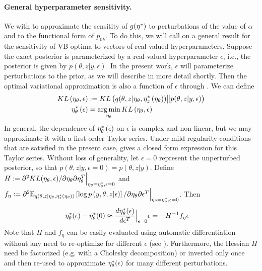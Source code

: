 
\paragraph{General hyperparameter sensitivity.}
%
We with to approximate the sensitity of $g(\eta^{*})$ to perturbations of the
value of $\alpha$ and to the functional form of $p_{0k}$.  To do this, we will
call on a general result for the sensitivity of VB optima to vectors of
real-valued hyperparameters.  Suppose the exact posterior is parameterized by a
real-valued hyperparameter $\epsilon$, i.e., the posterior is given by
$p\left(\theta, z \vert y, \epsilon\right)$. In the present work, $\epsilon$
will parameterize perturbations to the prior, as we will describe in more detail
shortly.  Then the optimal variational approximation is also a function of
$\epsilon$ through .  We can define
%
\begin{align}
KL\left(\eta_\theta, \epsilon\right) &:=
    KL\left(q(\theta, z \vert \eta_\theta, \eta_z^{*}\left(\eta_\theta\right))
    \big\| p(\theta, z | y, \epsilon) \right) \nonumber \\
\eta_\theta^{*}\left(\epsilon\right) &=
    \operatorname*{arg\,min}_{\eta_\theta} KL\left(\eta_\theta, \epsilon\right)
    \label{eq:pert_kl_objective}
\end{align}
%
In general, the dependence of $\eta_\theta^{*}\left(\epsilon\right)$ on $\epsilon$ is
complex and non-linear, but we may approximate it with a first-order Taylor
series.
Under mild regularity conditions that are satisfied in the present case,
\citet[Theorem 2]{giordano:2017:covariances} gives a closed form
expression for this Taylor series.
Without loss of generality, let $\epsilon=0$ represent the unperturbed
posterior, so that $p\left(\theta, z \vert y, \epsilon=0\right) = p\left(\theta,
z \vert y \right)$.
Define
$H := \partial^2 KL(\eta_\theta, \epsilon) /
    \partial \eta_\theta \partial \eta_\theta^T
    \Big\rvert_{\eta_\theta = \eta_\theta^{*}, \epsilon = 0}$ and
$f_\eta := \partial^2
    \mathbb{E}_{q\left(\theta, z \vert \eta_\theta, \eta_z^{*}(\eta_\theta)\right)} \left[ \log p\left(y, \theta, z \vert \epsilon \right) \right]
    / \partial \eta_\theta \partial \epsilon^T
    \Big\rvert_{\eta_\theta = \eta_\theta^{*}, \epsilon = 0}$.
Then
%
\begin{align}
\eta_\theta^{*}(\epsilon)  -  \eta_\theta^{*}(0) &\approx
\frac{d \eta_\theta^{*}(\epsilon)}{d\epsilon^T}\Big|_{\epsilon=0} \epsilon =
- H^{-1} f_\eta \epsilon
\label{eq:our_approximation}
\end{align}
%
Note that $H$ and $f_\eta$ can be easily evaluated using automatic
differentiation without any need to re-optimize for different $\epsilon$
\citep{maclaurin:2015:autograd} (see ).  Furthermore,
the Hessian $H$ need be factorized (e.g. with a Cholesky decomposition) or
inverted only once and then re-used to approximate $\eta_\theta^{*}(\epsilon)$ for
many different perturbations.


